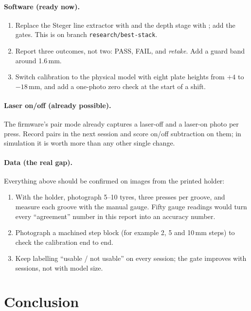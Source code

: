 \paragraph{Software (ready now).}
\begin{enumerate}
\item Replace the Steger line extractor with  and the depth stage with ; add the
      gates. This is  on branch \texttt{research/best-stack}.
\item Report three outcomes, not two: PASS, FAIL, and \emph{retake}. Add a guard band around 1.6\,mm.
\item Switch calibration to the physical model with eight plate heights from $+4$ to $-18$\,mm, and add a
      one-photo zero check at the start of a shift.
\end{enumerate}

\paragraph{Laser on/off (already possible).} The firmware's pair mode already captures a laser-off and a laser-on
photo per press. Record pairs in the next session and score on/off subtraction on them; in simulation it is worth
more than any other single change.

\paragraph{Data (the real gap).} Everything above should be confirmed on images from the printed holder:
\begin{enumerate}
\item With the holder, photograph 5--10 tyres, three presses per groove, and measure each groove with the manual
      gauge. Fifty gauge readings would turn every ``agreement'' number in this report into an accuracy number.
\item Photograph a machined step block (for example 2, 5 and 10\,mm steps) to check the calibration end to end.
\item Keep labelling ``usable / not usable'' on every session; the gate improves with sessions, not with model size.
\end{enumerate}

\section{Conclusion}

